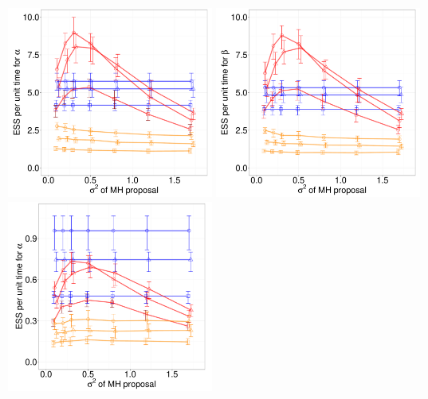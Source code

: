 {%
  \begin{figure}%
  \centering
  \begin{minipage}[hp]{0.82\linewidth}
  \centering
    \includegraphics [width=0.48\textwidth, angle=0]{figures_new_apr12/Q_alpha_dim3_18apr12.pdf}
    \includegraphics [width=0.48\textwidth, angle=0]{figures_new_apr12/Q_beta_dim3_18apr12.pdf}
  \centering
    \includegraphics [width=0.48\textwidth, angle=0]{figures_new_apr12/Q_alpha_dim10_18apr12.pdf}

\end{minipage}
\end{figure}}
